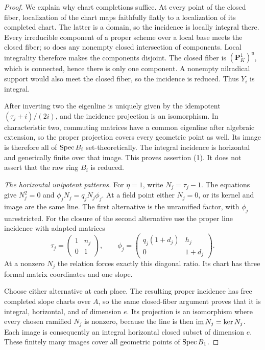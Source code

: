 \begin{proof}
We explain why chart completions suffice.  At every point of the
closed fiber, localization of the chart maps faithfully flatly to a
localization of its completed chart.  The latter is a domain, so the
incidence is locally integral there.  Every irreducible component of
a proper scheme over a local base meets the closed fiber; so does
any nonempty closed intersection of components.  Local integrality
therefore makes the components disjoint.  The closed fiber is
$(\mathbf P^1_K)^u$, which is connected, hence there is only one
component.  A nonempty nilradical support would also meet the closed
fiber, so the incidence is reduced.  Thus $Y_i$ is integral.

After inverting two the eigenline is uniquely given by the idempotent
$(\tau_j+i)/(2i)$, and the incidence projection is an isomorphism.
In characteristic two, commuting matrices have a common eigenline
after algebraic extension, so the proper projection covers every
geometric point as well.  Its image is therefore all of
$\operatorname{Spec} B_i$ set-theoretically.  The integral incidence is horizontal
and generically finite over that image.  This proves assertion (1).
It does not assert that the raw ring $B_i$ is reduced.

\emph{The horizontal unipotent patterns.}
For $\eta=1$, write $N_j=\tau_j-1$.  The equations give
$N_j^2=0$ and $\phi_jN_j=q_jN_j\phi_j$.  At a field point either
$N_j=0$, or its kernel and image are the same line.  The first
alternative is the unramified factor, with $\phi_j$ unrestricted.
For the closure of the second alternative use the proper line
incidence with adapted matrices
\begin{equation}\label{eq:unipotent-incidence}
\tau_j=\begin{pmatrix}1&n_j\\0&1\end{pmatrix},\qquad
\phi_j=\begin{pmatrix}q_j(1+d_j)&h_j\\0&1+d_j\end{pmatrix}.
\end{equation}
At a nonzero $N_j$ the relation forces exactly this diagonal ratio.
Its chart has three formal matrix coordinates and one slope.

Choose either alternative at each place.  The resulting proper
incidence has free completed slope charts over $A$, so the same
closed-fiber argument proves that it is integral, horizontal, and
of dimension $e$.  Its projection is an isomorphism where every
chosen ramified $N_j$ is nonzero, because the line is then
$\operatorname{im} N_j=\ker N_j$.  Each image is consequently an integral
horizontal closed subset of dimension $e$.  These finitely many
images cover all geometric points of $\operatorname{Spec} B_1$.


\end{proof}
